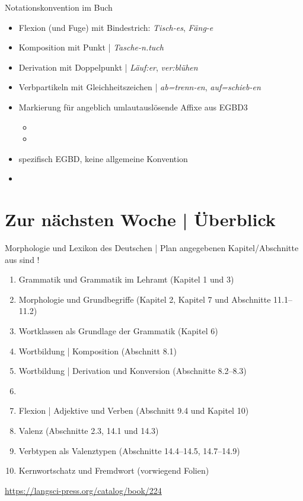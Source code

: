 \begin{frame}
  {Notationskonvention im Buch}
  \pause
  \begin{itemize}[<+->]
    \item \alert{Flexion (und Fuge)} mit Bindestrich: \textit{Tisch-es}, \textit{Fäng-e}
    \item \alert{Komposition} mit Punkt | \textit{Tasche-n.tuch}
    \item \alert{Derivation} mit Doppelpunkt | \textit{Läuf:er}, \textit{ver:blühen}
    \item \alert{Verbpartikeln} mit Gleichheitszeichen | \textit{ab=trenn-en}, \textit{auf=schieb-en}
    \Halbzeile
  \item Markierung für angeblich umlautauslösende Affixe aus EGBD3 
      \begin{itemize}[<+->]
        \item {}
        \item {}
      \end{itemize}
    \Halbzeile
  \item spezifisch EGBD, keine allgemeine Konvention
  \item {}
  \end{itemize}
\end{frame}


\section{Zur nächsten Woche | Überblick}

\begin{frame}
  {Morphologie und Lexikon des Deutschen | Plan}
   angegebenen Kapitel\slash Abschnitte aus  sind !\\
  \Halbzeile
  \begin{enumerate}
    \item Grammatik und Grammatik im Lehramt (Kapitel 1 und 3)
    \item Morphologie und Grundbegriffe (Kapitel 2, Kapitel 7 und Abschnitte 11.1--11.2)
    \item Wortklassen als Grundlage der Grammatik (Kapitel 6)
    \item Wortbildung | Komposition (Abschnitt 8.1)
    \item Wortbildung | Derivation und Konversion (Abschnitte 8.2--8.3)
    \item {}
    \item Flexion | Adjektive und Verben (Abschnitt 9.4 und Kapitel 10)
    \item Valenz (Abschnitte 2.3, 14.1 und 14.3)
    \item Verbtypen als Valenztypen (Abschnitte 14.4--14.5, 14.7--14.9) 
    \item Kernwortschatz und Fremdwort (vorwiegend Folien)
  \end{enumerate}
  \Halbzeile
  \centering 
  \url{https://langsci-press.org/catalog/book/224}
\end{frame}

